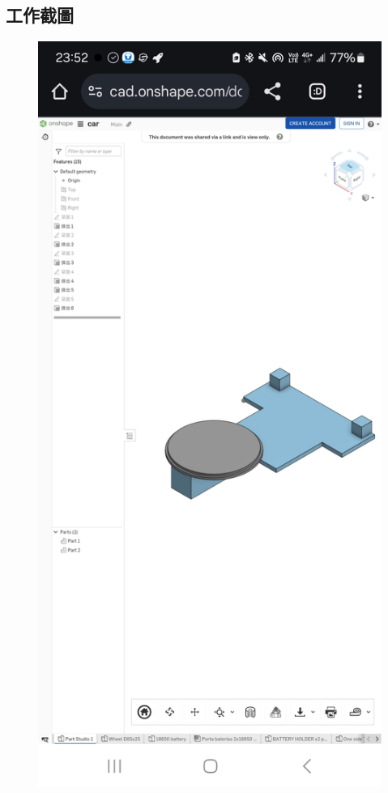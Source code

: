 \documentclass[a4paper,12pt]{article}
\begin{document}
\subsection{工作截圖}
\begin{center}\begin{figure}[H]\centering
\hfill
\begin{minipage}[t]{0.45\textwidth}
\centering
\includegraphics[width=\textwidth]{./model_images/Screenshot_1.jpg}

\end{minipage}
\end{figure}
\end{center}
\end{document}
